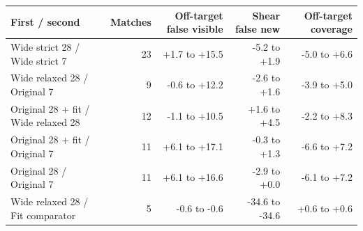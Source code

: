 \begin{tabular}{lrrrr}
\toprule
First / second & Matches & Off-target false visible & Shear false new & Off-target coverage \\
\midrule
Wide strict 28 / Wide strict 7 & 23 & +1.7 to +15.5 & -5.2 to +1.9 & -5.0 to +6.6 \\
Wide relaxed 28 / Original 7 & 9 & -0.6 to +12.2 & -2.6 to +1.6 & -3.9 to +5.0 \\
Original 28 + fit / Wide relaxed 28 & 12 & -1.1 to +10.5 & +1.6 to +4.5 & -2.2 to +8.3 \\
Original 28 + fit / Original 7 & 11 & +6.1 to +17.1 & -0.3 to +1.3 & -6.6 to +7.2 \\
Original 28 / Original 7 & 11 & +6.1 to +16.6 & -2.9 to +0.0 & -6.1 to +7.2 \\
Wide relaxed 28 / Fit comparator & 5 & -0.6 to -0.6 & -34.6 to -34.6 & +0.6 to +0.6 \\
\bottomrule
\end{tabular}
